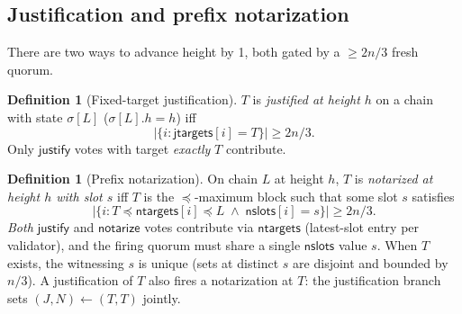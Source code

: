 \documentclass{article}
\newcommand{\just}{\ensuremath{\mathsf{justify}}\xspace}
\newcommand{\notar}{\ensuremath{\mathsf{notarize}}\xspace}
\newcommand{\jtargets}{\mathsf{jtargets}}
\newcommand{\ntargets}{\mathsf{ntargets}}
\newcommand{\nslots}{\mathsf{nslots}}
\theoremstyle{plain}
\theoremstyle{definition}
\newtheorem{definition}[theorem]{Definition}
\theoremstyle{remark}
\begin{document}
\subsection{Justification and prefix notarization}

There are two ways to advance height by 1, both gated by a $\geq 2n/3$ fresh quorum.

\begin{definition}[Fixed-target justification]\label{def:just}
$T$ is \emph{justified at height $h$} on a chain with state $\sigma[L]$ ($\sigma[L].h = h$) iff
\[
  |\{i : \jtargets[i] = T\}| \geq 2n/3.
\]
Only \just{} votes with target \emph{exactly} $T$ contribute.
\end{definition}

\begin{definition}[Prefix notarization]\label{def:notar}
On chain $L$ at height $h$, $T$ is \emph{notarized at height $h$ with slot $s$} iff $T$ is the $\preceq$-maximum block such that some slot $s$ satisfies
\[
  |\{i : T \preceq \ntargets[i] \preceq L \;\wedge\; \nslots[i] = s\}| \geq 2n/3.
\]
\emph{Both} \just{} and \notar{} votes contribute via $\ntargets$ (latest-slot entry per validator), and the firing quorum must share a single $\nslots$ value $s$. When $T$ exists, the witnessing $s$ is unique (sets at distinct $s$ are disjoint and bounded by $n/3$). A justification of $T$ also fires a notarization at $T$: the justification branch sets $(J, N) \gets (T, T)$ jointly.
\end{definition}
\end{document}
